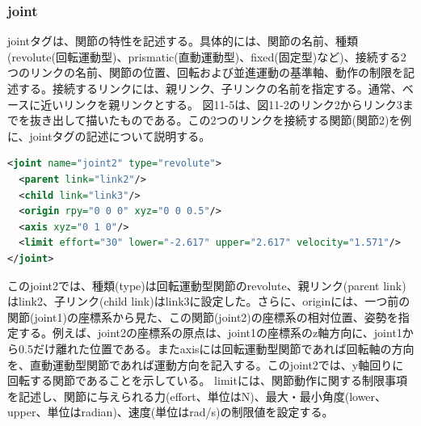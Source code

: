\subsubsection{joint}

jointタグは、関節の特性を記述する。具体的には、関節の名前、種類(revolute(回転運動型)、prismatic(直動運動型)、fixed(固定型)など)、接続する2つのリンクの名前、関節の位置、回転および並進運動の基準軸、動作の制限を記述する。接続するリンクには、親リンク、子リンクの名前を指定する。通常、ベースに近いリンクを親リンクとする。
図11-5は、図11-2のリンク2からリンク3までを抜き出して描いたものである。この2つのリンクを接続する関節(関節2)を例に、jointタグの記述について説明する。

\begin{lstlisting}[language=XML]
<joint name="joint2" type="revolute">
  <parent link="link2"/>
  <child link="link3"/>
  <origin rpy="0 0 0" xyz="0 0 0.5"/>
  <axis xyz="0 1 0"/>
  <limit effort="30" lower="-2.617" upper="2.617" velocity="1.571"/>
</joint>
\end{lstlisting}

このjoint2では、種類(type)は回転運動型関節のrevolute、親リンク(parent link)はlink2、子リンク(child link)はlink3に設定した。さらに、originには、一つ前の関節(joint1)の座標系から見た、この関節(joint2)の座標系の相対位置、姿勢を指定する。例えば、joint2の座標系の原点は、joint1の座標系のz軸方向に、joint1から0.5だけ離れた位置である。またaxisには回転運動型関節であれば回転軸の方向を、直動運動型関節であれば運動方向を記入する。このjoint2では、y軸回りに回転する関節であることを示している。 limitには、関節動作に関する制限事項を記述し、関節に与えられる力(effort、単位はN)、最大・最小角度(lower、upper、単位はradian)、速度(単位はrad/s)の制限値を設定する。


